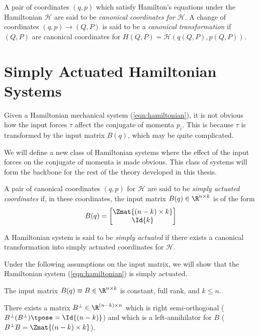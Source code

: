 A pair of coordinates \((q,p)\) which satisfy Hamilton's equations 
under the Hamiltonian \(\mathcal{H}\) are
said to be \textit{canonical coordinates for} \(\mathcal{H}\).  A change of
coordinates \((q,p) \rightarrow (Q,P)\) is said to be a \textit{canonical
transformation} if \((Q,P)\) are canonical coordinates for
\(H(Q,P) = \mathcal{H}\left(q(Q,P), p(Q,P)\right)\).


\section{Simply Actuated Hamiltonian Systems}
Given a Hamiltonian mechanical system (\ref{eqn:hamiltonian}), it is not obvious
how the input forces \(\tau\) affect the conjugate of momenta \(p_i\). 
This is because \(\tau\) is transformed by the input matrix \(B(q)\), which may
be quite complicated. 

We will define a new class of Hamiltonian systems where the effect of the input
forces on the conjugate of momenta is made obvious. This class of systems will
form the backbone for the rest of the theory developed in this thesis.

\begin{defn}
    A pair of canonical coordinates \((q,p)\) for \(\mathcal{H}\) are said to be
    \textit{simply actuated coordinates} if, in these coordinates, the input
    matrix \(B(q) \in \R^{n \times k}\) is of the form
    \[
        B(q) = \begin{bmatrix}
            \Zmat{(n-k)\times k} \\
            \Id{k}
        \end{bmatrix}
    \]
\end{defn}
\begin{defn}
    A Hamiltonian system is said to be \textit{simply actuated} if there exists
    a canonical transformation into simply actuated coordinates for
    \(\mathcal{H}\).
\end{defn}

Under the following assumptions on the input matrix, we will show that the
Hamiltonian system (\ref{eqn:hamiltonian}) is simply actuated.

\begin{assm}\label{assm:B-const}
    The input matrix \(B(q) \equiv B \in \R^{n\times k}\) is constant,
    full rank, and \(k \leq n\).
\end{assm}
\begin{assm}\label{assm:B-perp}
    There exists a matrix 
    \(B^\perp \in \R^{(n-k)\times n}\)
    which is right semi-orthogonal 
    (\ie \(B^\perp(B^\perp)\tpose = \Id{(n-k)}\))
    and which is a left-annihilator for \(B\)
    (\ie \(B^\perp B = \Zmat{(n-k) \times k}\)).
\end{assm}

